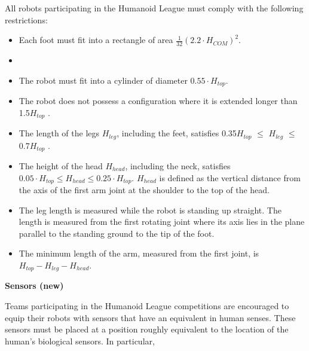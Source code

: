 All robots participating in the Humanoid League must comply with the following restrictions:

\begin{itemize}
\item Each foot must fit into a rectangle of area $\tfrac{1}{32} (2.2 \cdot H_{COM})^2$. 
\item {}
\item The robot must fit into a cylinder of diameter $0.55 \cdot H_{top}$.
\item The robot does not possess a configuration where it is extended longer than 1.5{\textperiodcentered}$H_{top}$ .
\item The length of the legs $H_{leg}$, including the feet, satisfies 0.35{\textperiodcentered}$H_{top}$ ${\leq}$ $H_{leg}$ ${\leq}$ 0.7{\textperiodcentered}$H_{top}$ .
\item The height of the head $H_{head}$, including the neck, satisfies $0.05 \cdot H_{top} \leq H_{head} \leq 0.25 \cdot H_{top}$. $H_{head}$ is defined as the vertical distance from the axis of the first arm joint at the shoulder to the top of the head. 
\item The leg length is measured while the robot is standing up straight. The length is measured from the first rotating joint where its axis lies in the plane parallel to the standing ground to the tip of the foot.
\item The minimum length of the arm, measured from the first joint, is $H_{top} - H_{leg} - H_{head}$.
\end{itemize}


{\bfseries Sensors (new)}

\headlinebox

Teams participating in the Humanoid League competitions are encouraged to equip their robots with sensors that have an equivalent in human senses. These sensors must be placed at a position roughly equivalent to the location of the human{\textquoteright}s biological sensors. In particular, 

